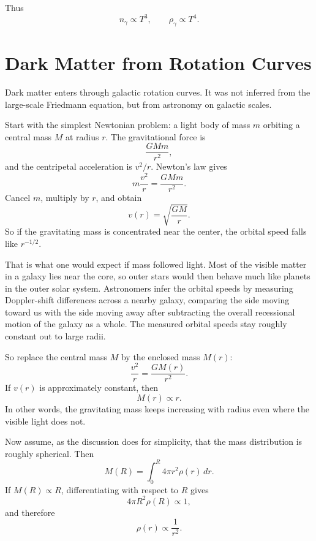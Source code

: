 Thus
\begin{equation}
n_\gamma\propto T^3,
\qquad
\rho_\gamma\propto T^4.
\end{equation}

\section{Dark Matter from Rotation Curves}

Dark matter enters through galactic rotation curves. It was not inferred from the large-scale Friedmann equation, but from astronomy on galactic scales.

Start with the simplest Newtonian problem: a light body of mass \(m\) orbiting a central mass \(M\) at radius \(r\). The gravitational force is
\begin{equation}
\frac{GMm}{r^2},
\end{equation}
and the centripetal acceleration is \(v^2/r\). Newton's law gives
\begin{equation}
m\frac{v^2}{r}=\frac{GMm}{r^2}.
\end{equation}
Cancel \(m\), multiply by \(r\), and obtain
\begin{equation}
v(r)=\sqrt{\frac{GM}{r}}.
\end{equation}
So if the gravitating mass is concentrated near the center, the orbital speed falls like \(r^{-1/2}\).

That is what one would expect if mass followed light. Most of the visible matter in a galaxy lies near the core, so outer stars would then behave much like planets in the outer solar system. Astronomers infer the orbital speeds by measuring Doppler-shift differences across a nearby galaxy, comparing the side moving toward us with the side moving away after subtracting the overall recessional motion of the galaxy as a whole. The measured orbital speeds stay roughly constant out to large radii.

So replace the central mass \(M\) by the enclosed mass \(M(r)\):
\begin{equation}
\frac{v^2}{r}=\frac{G M(r)}{r^2}.
\end{equation}
If \(v(r)\) is approximately constant, then
\begin{equation}
M(r)\propto r.
\end{equation}
In other words, the gravitating mass keeps increasing with radius even where the visible light does not.

Now assume, as the discussion does for simplicity, that the mass distribution is roughly spherical. Then
\begin{equation}
M(R)=\int_0^R 4\pi r^2\rho(r)\,dr.
\end{equation}
If \(M(R)\propto R\), differentiating with respect to \(R\) gives
\begin{equation}
4\pi R^2\rho(R)\propto 1,
\end{equation}
and therefore
\begin{equation}
\rho(r)\propto \frac{1}{r^2}.
\end{equation}

